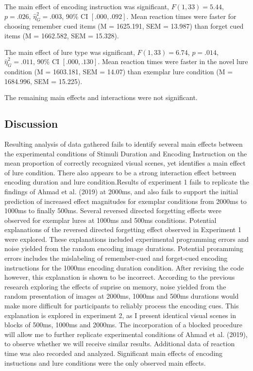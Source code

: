 \documentclass[
  english,
  man,floatsintext]{apa6}
\begin{document}
The main effect of encoding instruction was significant, \(F(1, 33) = 5.44\), \(p = .026\), \(\hat{\eta}^2_G = .003\), 90\% CI \([.000, .092]\). Mean reaction times were faster for choosing remember cued items (M = 1625.191, SEM = 13.987) than forget cued items (M = 1662.582, SEM = 15.328).

The main effect of lure type was significant, \(F(1, 33) = 6.74\), \(p = .014\), \(\hat{\eta}^2_G = .011\), 90\% CI \([.000, .130]\). Mean reaction times were faster in the novel lure condition (M = 1603.181, SEM = 14.07) than exemplar lure condition (M = 1684.996, SEM = 15.225).

The remaining main effects and interactions were not significant.

\hypertarget{discussion}{%
\subsection{Discussion}\label{discussion}}

Resulting analysis of data gathered fails to identify several main effects between the experimental conditions of Stimuli Duration and Encoding Instruction on the mean proportion of correctly recognized visual scenes, yet identifies a main effect of lure condition.
There also appears to be a strong interaction effect between encoding duration and lure condition.Results of experiment 1 fails to replicate the findings of Ahmad et al. (2019) at 2000ms, and also fails to support the initial prediction of increased effect magnitudes for exemplar conditions from 2000ms to 1000ms to finally 500ms. Several reversed directed forgetting effects were observed for exemplar lures at 1000ms and 500ms conditions. Potential explanations of the reversed directed forgetting effect observed in Experiment 1 were explored.
These explanations included experimental programming errors and noise yielded from the random encoding image durations.
Potential proramming errors includes the mislabeling of remember-cued and forget-cued encoding instructions for the 1000ms encoding duration condition. After revising the code however, this explanation is shown to be incorrect.
According to the previous research exploring the effects of suprise on memory, noise yielded from the random presentation of images at 2000ms, 1000ms and 500ms durations would make more difficult for participants to reliably process the encoding cues. This explanation is explored in experiment 2, as I present identical visual scenes in blocks of 500ms, 1000ms and 2000ms. The incorporation of a blocked procedure will allow me to further replicate experimental conditions of Ahmad et al. (2019), to observe whether we will receive similar results.
Additional data of reaction time was also recorded and analyzed. Significant main effects of encoding instuctions and lure conditions were the only observed main effects.
\end{document}
